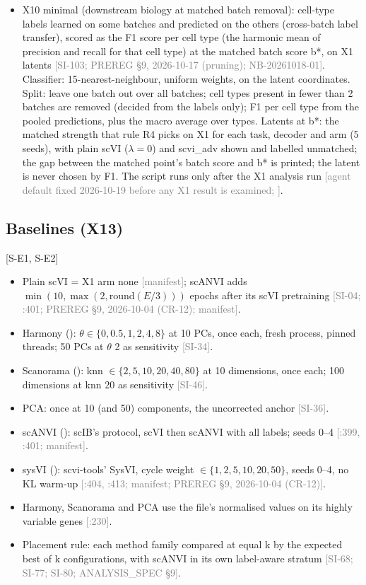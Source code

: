 \documentclass[11pt]{article}
\newcommand{\src}[1]{{\scriptsize\textcolor{gray}{[#1]}}}
\begin{document}
\begin{itemize}
\item X10 minimal (downstream biology at matched batch removal): cell-type labels learned on some batches and predicted on the others (cross-batch label transfer), scored as the F1 score per cell type (the harmonic mean of precision and recall for that cell type) at the matched batch score b*, on X1 latents \src{SI-103; PREREG \S9, 2026-10-17 (pruning); NB-20261018-01}. Classifier: 15-nearest-neighbour, uniform weights, on the latent coordinates. Split: leave one batch out over all batches; cell types present in fewer than 2 batches are removed (decided from the labels only); F1 per cell type from the pooled predictions, plus the macro average over types. Latents at b*: the matched strength that rule R4 picks on X1 for each task, decoder and arm (5 seeds), with plain scVI ($\lambda = 0$) and scvi\_adv shown and labelled unmatched; the gap between the matched point's batch score and b* is printed; the latent is never chosen by F1. The script runs only after the X1 analysis run \src{agent default fixed 2026-10-19 before any X1 result is examined; \file{paper/R0\_X10\_DEFAULTS.md}}.
\end{itemize}

\subsection{Baselines (X13)}
[S-E1, S-E2]
\begin{itemize}
\item Plain scVI = X1 arm none \src{manifest}; scANVI adds $\min(10, \max(2, \mathrm{round}(E/3)))$ epochs after its scVI pretraining \src{SI-04; :401; PREREG \S9, 2026-10-04 (CR-12); manifest}.
\item Harmony (\citealp{korsunsky2019fast}): $\theta \in \{0, 0.5, 1, 2, 4, 8\}$ at 10 PCs, once each, fresh process, pinned threads; 50 PCs at $\theta$ 2 as sensitivity \src{SI-34}.
\item Scanorama (\citealp{hie2019efficient}): knn $\in \{2, 5, 10, 20, 40, 80\}$ at 10 dimensions, once each; 100 dimensions at knn 20 as sensitivity \src{SI-46}.
\item PCA: once at 10 (and 50) components, the uncorrected anchor \src{SI-36}.
\item scANVI (\citealp{xu2021probabilistic}): scIB's protocol, scVI then scANVI with all labels; seeds 0--4 \src{:399, :401; manifest}.
\item sysVI (\citealp{hrovatin2025integrating}): scvi-tools' SysVI, cycle weight $\in \{1, 2, 5, 10, 20, 50\}$, seeds 0--4, no KL warm-up \src{:404, :413; manifest; PREREG \S9, 2026-10-04 (CR-12)}.
\item Harmony, Scanorama and PCA use the file's normalised values on its highly variable genes \src{:230}.
\item Placement rule: each method family compared at equal k by the expected best of k configurations, with scANVI in its own label-aware stratum \src{SI-68; SI-77; SI-80; ANALYSIS\_SPEC \S9}.
\end{itemize}
\end{document}
